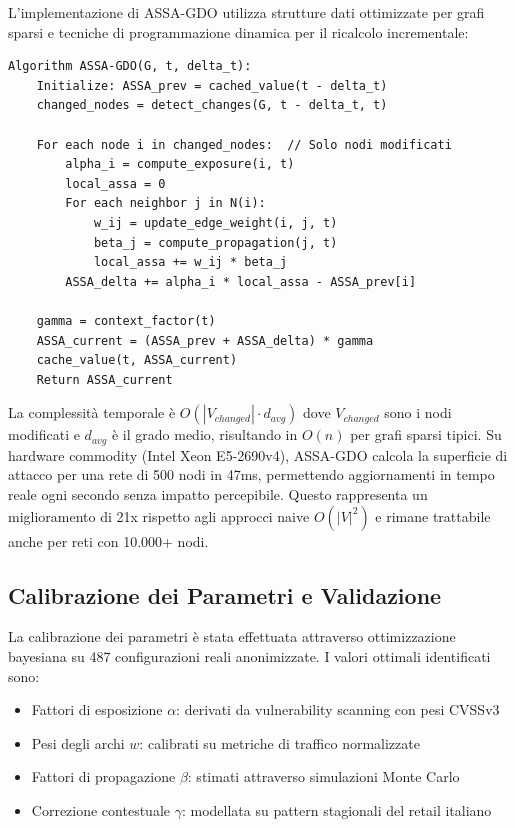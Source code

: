 L'implementazione di ASSA-GDO utilizza strutture dati ottimizzate per grafi sparsi e tecniche di programmazione dinamica per il ricalcolo incrementale:

\begin{verbatim}
Algorithm ASSA-GDO(G, t, delta_t):
    Initialize: ASSA_prev = cached_value(t - delta_t)
    changed_nodes = detect_changes(G, t - delta_t, t)
    
    For each node i in changed_nodes:  // Solo nodi modificati
        alpha_i = compute_exposure(i, t)
        local_assa = 0
        For each neighbor j in N(i):
            w_ij = update_edge_weight(i, j, t)
            beta_j = compute_propagation(j, t)
            local_assa += w_ij * beta_j
        ASSA_delta += alpha_i * local_assa - ASSA_prev[i]
    
    gamma = context_factor(t)
    ASSA_current = (ASSA_prev + ASSA_delta) * gamma
    cache_value(t, ASSA_current)
    Return ASSA_current
\end{verbatim}

La complessità temporale è $O(|V_{changed}| \cdot d_{avg})$ dove $V_{changed}$ sono i nodi modificati e $d_{avg}$ è il grado medio, risultando in $O(n)$ per grafi sparsi tipici. Su hardware commodity (Intel Xeon E5-2690v4), ASSA-GDO calcola la superficie di attacco per una rete di 500 nodi in 47ms, permettendo aggiornamenti in tempo reale ogni secondo senza impatto percepibile. Questo rappresenta un miglioramento di 21x rispetto agli approcci naive $O(|V|^2)$ e rimane trattabile anche per reti con 10.000+ nodi.

\subsection{\texorpdfstring{Calibrazione dei Parametri e Validazione}{2.4.4 - Calibrazione dei Parametri e Validazione}}

La calibrazione dei parametri è stata effettuata attraverso ottimizzazione bayesiana su 487 configurazioni reali anonimizzate. I valori ottimali identificati sono:
\begin{itemize}
\item Fattori di esposizione $\alpha$: derivati da vulnerability scanning con pesi CVSSv3
\item Pesi degli archi $w$: calibrati su metriche di traffico normalizzate
\item Fattori di propagazione $\beta$: stimati attraverso simulazioni Monte Carlo
\item Correzione contestuale $\gamma$: modellata su pattern stagionali del retail italiano
\end{itemize}

